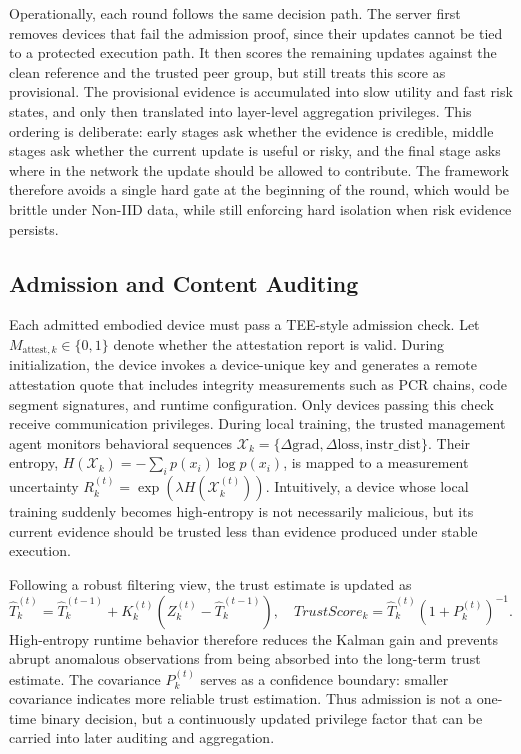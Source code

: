 \documentclass[runningheads,orivec]{llncs}
\begin{document}
Operationally, each round follows the same decision path. The server first removes devices that fail the admission proof, since their updates cannot be tied to a protected execution path. It then scores the remaining updates against the clean reference and the trusted peer group, but still treats this score as provisional. The provisional evidence is accumulated into slow utility and fast risk states, and only then translated into layer-level aggregation privileges. This ordering is deliberate: early stages ask whether the evidence is credible, middle stages ask whether the current update is useful or risky, and the final stage asks where in the network the update should be allowed to contribute. The framework therefore avoids a single hard gate at the beginning of the round, which would be brittle under Non-IID data, while still enforcing hard isolation when risk evidence persists.

\subsection{Admission and Content Auditing}

Each admitted embodied device must pass a TEE-style admission check. Let $M_{\text{attest},k}\in\{0,1\}$ denote whether the attestation report is valid. During initialization, the device invokes a device-unique key and generates a remote attestation quote that includes integrity measurements such as PCR chains, code segment signatures, and runtime configuration. Only devices passing this check receive communication privileges. During local training, the trusted management agent monitors behavioral sequences
$\mathcal{X}_k=\{\Delta\text{grad},\Delta\text{loss},\text{instr\_dist}\}$. Their entropy, $H(\mathcal{X}_k)=-\sum_i p(x_i)\log p(x_i)$, is mapped to a measurement uncertainty $R_k^{(t)}=\exp(\lambda H(\mathcal{X}_k^{(t)}))$. Intuitively, a device whose local training suddenly becomes high-entropy is not necessarily malicious, but its current evidence should be trusted less than evidence produced under stable execution.

Following a robust filtering view, the trust estimate is updated as
\begin{equation}
    \hat{T}_{k}^{(t)}=\hat{T}_{k}^{(t-1)}+K_k^{(t)}(Z_k^{(t)}-\hat{T}_{k}^{(t-1)}),\quad
    TrustScore_k=\hat{T}_{k}^{(t)}(1+P_k^{(t)})^{-1}.
\end{equation}
High-entropy runtime behavior therefore reduces the Kalman gain and prevents abrupt anomalous observations from being absorbed into the long-term trust estimate. The covariance $P_k^{(t)}$ serves as a confidence boundary: smaller covariance indicates more reliable trust estimation. Thus admission is not a one-time binary decision, but a continuously updated privilege factor that can be carried into later auditing and aggregation.
\end{document}
